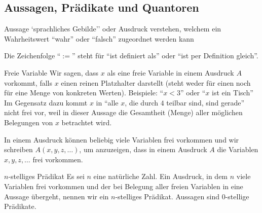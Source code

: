 \subsection{Aussagen, Prädikate und Quantoren}
\begin{definition}{Aussage}
    `sprachliches Gebilde'' oder Ausdruck verstehen, welchem ein Wahrheitswert ``wahr'' oder ``falsch'' zugeordnet werden kann
\end{definition}
\begin{remark}
            Die Zeichenfolge ``$:=$'' steht für ``ist definiert als'' oder ``ist per Definition gleich''.
\end{remark}
\begin{comment}
\begin{remark}
  Obwohl nach Definition jede Aussage einen eindeutigen Wahrheitswert besitzt, bedeutet dies nicht, dass dieser bekannt sein muss. Der Satz ``es gibt unendlich viele Primzahlen'' war beispielsweise bereits eine Aussage, bevor man wusste, dass er wahr ist.
\end{remark}
\end{comment}



\begin{definition}{Freie Variable}
Wir sagen, dass $x$ als eine freie Variable in einem Ausdruck $A$ vorkommt, falls $x$ einen reinen Platzhalter darstellt (steht weder für einen noch für eine Menge von konkreten Werten). Beispiele: ``$x<3$'' oder ``$x$ ist ein Tisch'' 
\\ Im Gegensatz dazu kommt $x$ in ``alle $x$, die durch $4$ teilbar sind, sind gerade'' nicht frei vor, weil in dieser Aussage die Gesamtheit (Menge) aller möglichen Belegungen von $x$ betrachtet wird. 
\end{definition}

\begin{remark}
In einem Ausdruck können beliebig viele Variablen frei vorkommen und wir schreiben $A(x,y,z,\dots)$, um anzuzeigen, dass in einem Ausdruck $A$ die Variablen $x,y,z,\dots$ frei vorkommen.
\end{remark}

\begin{definition}{$n$-stelliges Prädikat}
Es sei $n$ eine natürliche Zahl. Ein Ausdruck, in dem $n$ viele Variablen frei vorkommen und der bei Belegung aller freien Variablen in eine Aussage übergeht, nennen wir ein $n$-stelliges Prädikat. Aussagen sind $0$-stellige Prädikate.
\end{definition}

